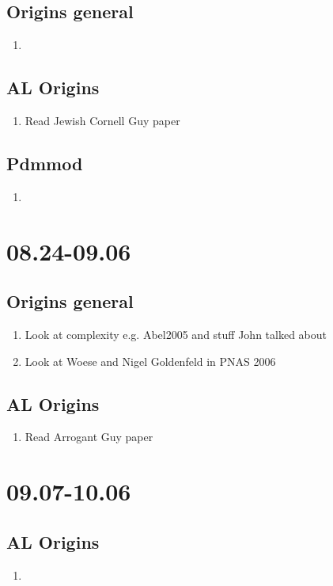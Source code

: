 \documentclass[12pt]{paper}
\begin{document}
\subsection*{Origins general}
\begin{enumerate}
\item 
\end{enumerate}

\subsection*{AL Origins}
\begin{enumerate}
\item Read Jewish Cornell Guy paper
\end{enumerate}

\subsection*{Pdmmod}
\begin{enumerate}
 \item 
\end{enumerate}

\section{08.24-09.06}
\subsection*{Origins general}
\begin{enumerate}
 \item   Look at complexity e.g. Abel2005 and stuff John talked about
\item  Look at  Woese and Nigel Goldenfeld in PNAS 2006
\end{enumerate}

\subsection*{AL Origins}
\begin{enumerate}
 \item   Read Arrogant Guy paper
\end{enumerate}

\section{09.07-10.06}
\subsection*{AL Origins}
\begin{enumerate}
 \item   
\end{enumerate}
\end{document}
